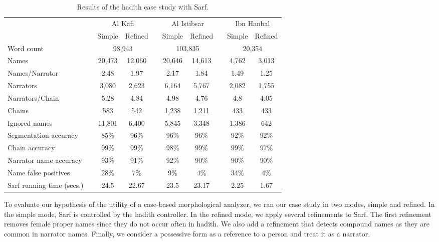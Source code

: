 \documentclass[11pt,letterpaper]{article}
\begin{document}
\begin{table*}[bt]
\centering
\caption{Results of the hadith case study with Sarf.}
\begin{tabular}{lp{.2cm}ccp{.2cm}ccp{.2cm}cc} %
 & & \multicolumn{2}{c}{Al Kafi} & & \multicolumn{2}{c}{Al Istibsar} & &\multicolumn{2}{c}{Ibn Hanbal} \\ \cline{3-10}
 & & Simple & Refined & & Simple & Refined & & Simple  & Refined \\\bottomrule  %
Word count & &\multicolumn{2}{c}{98,943} & & \multicolumn{2}{c}{103,835} & & \multicolumn{2}{c}{20,354} \\ 
 Names      & & 20,473 & 12,060  & &20,646 &  14,613& & 4,762 & 3,013\\
Names/Narrator& &2.48 & 1.97 & & 2.17 &  1.84& & 1.49 & 1.25 \\
Narrators & &3,080 & 2,623 & & 6,164 &  5,767& & 2,082 & 1,755 \\ 
Narrators/Chain & & 5.28 & 4.84 & & 4.98&  4.76 & & 4.8 &4.05 \\
Chains & & 583 & 542 &  & 1,238& 1,211& & 433 & 433 \\ 
Ignored names & & 11,801 & 6,400 &  & 5,845 & 3,348 & & 1,386 & 642 \\ \hline
Segmentation accuracy & & 85\% & 96\%& & 96\%& 96\%& & 92\%& 92\%\\ 
Chain accuracy & & 99\% & 99\%&  & 98\%& 99\%& & 99\% & 97\% \\ 
Narrator name accuracy & & 93\% & 91\%& &  92\%& 90\% & & 90\% & 90\% \\ \hline
Name false positives & & 28\% & 7\%&  & 9\%& 4\% & & 34\% & 4\% \\ \hline
Sarf running time (secs.)& & 24.5 & 22.67 & & 23.5 & 23.17 & & 2.25 & 1.67\\ \hline
\end{tabular}
\normalsize
\label{t:hadithresallresults}
\end{table*}

To evaluate our hypothesis of the utility of a case-based morphological analyzer,
we ran our case study in two modes, simple and refined.
In the simple mode, Sarf is controlled by the hadith controller.
In the refined mode, we apply several refinements to Sarf.
The first refinement removes female proper names since they do not occur often in
hadith.
We also add a refinement that detects compound names as they are common in narrator
names.
Finally, we consider a possessive form as a reference to a person and treat
it as a narrator.
\end{document}

